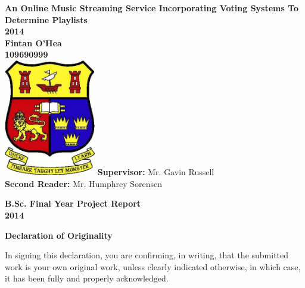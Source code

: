 \documentclass[a4paper, 12pt]{report}
\begin{document}
\lstset{language=JavaScript, basicstyle=\footnotesize\ttfamily, tabsize=1, showstringspaces=false}
\begin{titlepage}
    \centering
    \vfill
    {\bfseries\Large
        An Online Music Streaming Service Incorporating Voting Systems To Determine Playlists\\
        \vskip1cm
        2014\\
        \vskip2cm
        Fintan O'Hea\\
        109690999\\
    }    
    \vfill
    \includegraphics[width=4cm]{ucc_crest.jpg} %
    \vskip2cm
    \Large\textbf{Supervisor:} Mr. Gavin Russell\\
	\Large\textbf{Second Reader:} Mr. Humphrey Sorensen\\
    \vfill
\end{titlepage}

\clearpage

\begin{center}
\Large \textbf{B.Sc. Final Year Project Report \\
2014}
\end{center}
\begin{flushleft}
\end{flushleft}
\begin{center}
\Large \textbf{Declaration of Originality}
\end{center}
In signing this declaration, you are confirming, in writing, that the submitted work is your own original work, unless clearly indicated otherwise, in which case, it has been fully and properly acknowledged. \\
\end{document}
